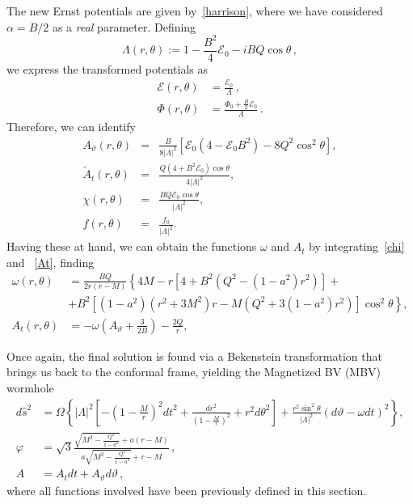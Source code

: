 \documentclass[aps,preprint,groupedaddress,nofootinbib,superscriptaddress,showkeys,showpacs,eqsecnum,amsmath,amssymb]{revtex4-1}
\newcommand{\ernst}{\mathcal{E}}
\begin{document}
The new Ernst potentials are given by~\eqref{harrison}, where we have considered $\alpha=B/2$ as a \emph{real} parameter. Defining 
\begin{equation}
\Lambda(r,\theta) := 1 - \frac{B^2}{4} \mathcal{E}_0-iBQ \cos\theta \,,
\end{equation}
we express the transformed potentials as
\begin{subequations}
\begin{align}
\ernst(r,\theta) &= \frac{\ernst_0}{\Lambda} \,, \\
\Phi(r,\theta) &= \frac{\Phi_0 + \frac{B}{2}\ernst_0}{\Lambda} \,.
\end{align}
\end{subequations}
Therefore, we can identify 
\begin{subequations}\label{eq:NewFunctionsMagnetic}
    \begin{eqnarray}
        A_\vartheta(r, \theta) &=&  \frac{B}{8|\Lambda|^2} \left[ \ernst_0\left( 4-\ernst_0B^2\right) - 8Q^2\cos^2\theta\right],\\
        \tilde{A}_t(r,\theta) &=& \frac{Q(4+B^2\ernst_0)\cos\theta}{4|\Lambda|^2},\\
        \chi(r,\theta) &=& \frac{BQ\ernst_0 \cos\theta}{|\Lambda|^2},\\
        f(r,\theta) &=& \frac{f_0}{|\Lambda|^2}.
    \end{eqnarray}
\end{subequations}
Having these at hand, we can obtain the functions $\omega$ and $A_t$ by integrating~\eqref{chi} and ~\eqref{At}, finding
\begin{subequations}
\begin{align}
 \omega(r, \theta) &= \frac{BQ}{2 r (r - M)} \left\lbrace 4M - r\left[ 4+B^2\left( Q^2 - (1-a^2)r^2\right)\right]\right.+\nonumber \\  
   & + \left.B^2\left[ (1-a^2)(r^2+3M^2)r- M\left( Q^2 +3(1-a^2)r^2\right) \right]\cos^2\theta\right\rbrace,\label{eq:OmegaMagnetized}\\
   A_t(r,\theta)&=-\omega\left( A_\vartheta + \frac{3}{2B}\right)-\frac{2Q}{r},
\end{align}
\end{subequations}

Once again, the final solution is found via a Bekenstein transformation that brings us back to the conformal frame, yielding the Magnetized BV (MBV) wormhole
\begin{subequations}\label{MelvinWH}
\begin{align}
d\hat{s}^2 &= \Omega \left\lbrace
|\Lambda|^2 \left[
-\left(1 - \frac{M}{r}\right)^2 {dt}^2 + \frac{{dr}^2}{\left(1 - \frac{M}{r}\right)^2} + r^2 {d\theta}^2 \right] + \frac{r^2\sin^2\theta}{|\Lambda|^2} \left( d\vartheta - \omega dt \right)^2 \right\rbrace,\\
\varphi &= \sqrt{3}  \frac{\sqrt{M^2 - \frac{Q^2}{1-a^2}} + a(r-M)}{a \sqrt{M^2 - \frac{Q^2}{1-a^2}} + r-M} \,,\\
A &= A_t dt + A_\vartheta d\vartheta \,, 
\end{align}
\end{subequations}
where all functions involved have been previously defined in this section.
\end{document}
